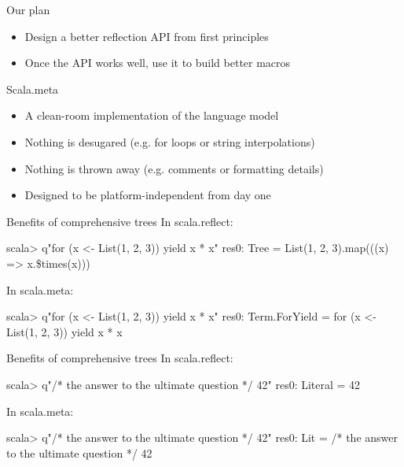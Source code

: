\documentclass[svgnames,dvipsnames,hyperref={bookmarks=false},usepdftitle=false]{beamer}
\begin{document}


\begin{frame}{Our plan}
\begin{itemize}
\item Design a better reflection API from first principles
\item Once the API works well, use it to build better macros
\end{itemize}
\end{frame}

\begin{frame}{Scala.meta}
\begin{itemize}
\item A clean-room implementation of the language model
\item Nothing is desugared (e.g. for loops or string interpolations)
\item Nothing is thrown away (e.g. comments or formatting details)
\item Designed to be platform-independent from day one
\end{itemize}
\end{frame}

\begin{frame}[fragile]{Benefits of comprehensive trees}
In scala.reflect:
\begin{semiverbatim}
scala> q"for (x <- List(1, 2, 3)) yield x * x"
res0: Tree = List(1, 2, 3).map(((x) => x.\$times(x)))
\end{semiverbatim}
\vskip25pt
In scala.meta:
\begin{semiverbatim}
scala> q"for (x <- List(1, 2, 3)) yield x * x"
res0: Term.ForYield = for (x <- List(1, 2, 3)) yield x * x
\end{semiverbatim}
\end{frame}

\begin{frame}[fragile]{Benefits of comprehensive trees}
In scala.reflect:
\begin{semiverbatim}
scala> q"/* the answer to the ultimate question */ 42"
res0: Literal = 42
\end{semiverbatim}
\vskip25pt
In scala.meta:
\begin{semiverbatim}
scala> q"/* the answer to the ultimate question */ 42"
res0: Lit = /* the answer to the ultimate question */ 42
\end{semiverbatim}
\end{frame}
\end{document}
